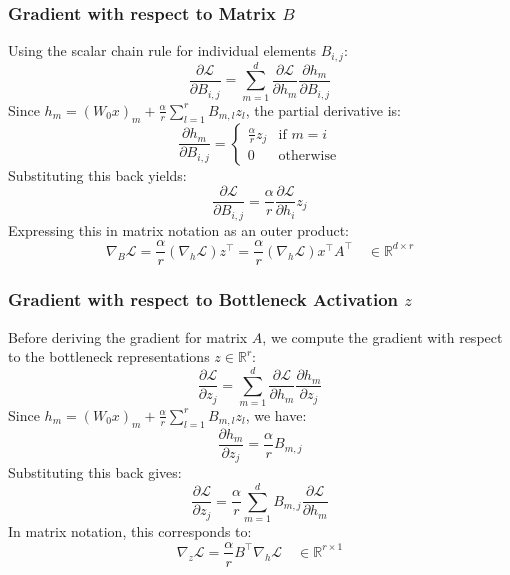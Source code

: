 \documentclass{article}
\begin{document}
\subsubsection{Gradient with respect to Matrix $B$}
Using the scalar chain rule for individual elements $B_{i,j}$:
\begin{equation}
  \frac{\partial \mathcal{L}}{\partial B_{i,j}} = \sum_{m=1}^d \frac{\partial \mathcal{L}}{\partial h_m} \frac{\partial h_m}{\partial B_{i,j}}
\end{equation}
Since $h_m = (W_0 x)_m + \frac{\alpha}{r} \sum_{l=1}^r B_{m,l} z_l$, the partial derivative is:
\begin{equation}
  \frac{\partial h_m}{\partial B_{i,j}} = \begin{cases} \frac{\alpha}{r} z_j & \text{if } m = i \\ 0 & \text{otherwise} \end{cases}
\end{equation}
Substituting this back yields:
\begin{equation}
  \frac{\partial \mathcal{L}}{\partial B_{i,j}} = \frac{\alpha}{r} \frac{\partial \mathcal{L}}{\partial h_i} z_j
\end{equation}
Expressing this in matrix notation as an outer product:
\begin{equation}
  \nabla_B \mathcal{L} = \frac{\alpha}{r} (\nabla_h \mathcal{L}) z^\top = \frac{\alpha}{r} (\nabla_h \mathcal{L}) x^\top A^\top \quad \in \mathbb{R}^{d \times r}
\end{equation}

\subsubsection{Gradient with respect to Bottleneck Activation $z$}
Before deriving the gradient for matrix $A$, we compute the gradient with respect to the bottleneck representations $z \in \mathbb{R}^r$:
\begin{equation}
  \frac{\partial \mathcal{L}}{\partial z_j} = \sum_{m=1}^d \frac{\partial \mathcal{L}}{\partial h_m} \frac{\partial h_m}{\partial z_j}
\end{equation}
Since $h_m = (W_0 x)_m + \frac{\alpha}{r} \sum_{l=1}^r B_{m,l} z_l$, we have:
\begin{equation}
  \frac{\partial h_m}{\partial z_j} = \frac{\alpha}{r} B_{m,j}
\end{equation}
Substituting this back gives:
\begin{equation}
  \frac{\partial \mathcal{L}}{\partial z_j} = \frac{\alpha}{r} \sum_{m=1}^d B_{m,j} \frac{\partial \mathcal{L}}{\partial h_m}
\end{equation}
In matrix notation, this corresponds to:
\begin{equation}
  \nabla_z \mathcal{L} = \frac{\alpha}{r} B^\top \nabla_h \mathcal{L} \quad \in \mathbb{R}^{r \times 1}
\end{equation}
\end{document}
